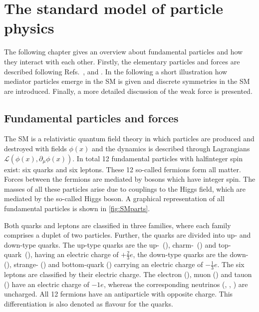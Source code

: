 \chapter{The standard model of particle physics}
\label{chap:SM}

The following chapter gives an overview about fundamental particles and how they interact with each other.
Firstly, the elementary particles and forces are described following Refs.~\cite{Griffiths:111880}, \cite{Perkins:396126} and \cite{Peskin:257493}.
In the following a short illustration how mediator particles emerge in the \ac{SM} is given and discrete symmetries in the \ac{SM} are introduced.
Finally, a more detailed discussion of the weak force is presented.

\section{Fundamental particles and forces}
\label{sec:fundamentalparts}

The \ac{SM} is a relativistic quantum field theory in which particles are produced and destroyed with fields $\phi(x)$ and the dynamics is described through Lagrangians $\mathcal{L}\left(\phi(x),\partial_{\mu}\phi(x)\right)$.
In total \num{12} fundamental particles with halfinteger spin exist: six quarks and six leptons.
These \num{12} so-called fermions form all matter.
Forces between the fermions are mediated by bosons which have integer spin.
The masses of all these particles arise due to couplings to the Higgs field, which are mediated by the so-called Higgs boson.
A graphical representation of all fundamental particles is shown in \cref{fig:SMparts}.

Both quarks and leptons are classified in three families, where each family comprises a duplet of two particles.
Further, the quarks are divided into up- and down-type quarks.
The up-type quarks are the \mbox{up- (\uquark)}, \mbox{charm- (\cquark)} and \mbox{top-quark (\tquark)}, having an electric charge of $+\frac{2}{3}e$, the down-type quarks are the down- (\dquark), strange- (\squark) and bottom-quark (\bquark) carrying an electric charge of $-\frac{1}{3}e$.
The six leptons are classified by their electric charge.
The electron  (\electron), muon (\muon) and tauon (\tauon) have an electric charge of $-1e$, whereas the corresponding neutrinos (\neue, \neum, \neut) are uncharged.
All \num{12} fermions have an antiparticle with opposite charge.
This differentiation is also denoted as flavour for the quarks.

